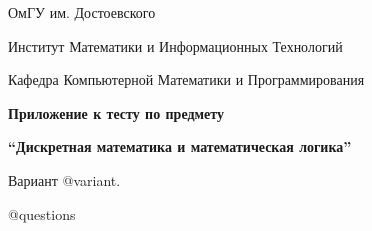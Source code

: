 \documentclass[russian]{article}
\begin{document}
\begin{flushright}
ОмГУ им. Достоевского
\par Институт Математики и Информационных Технологий
\par Кафедра Компьютерной Математики и Программирования
\end{flushright}

\begin{center}
\par\textbf{\large{}Приложение к тесту по предмету}{\large\par}
\par \textbf{\large{}``Дискретная математика и математическая логика''}{\large\par}

\begin{spacing}{3}
\par Вариант @variant.
\end{spacing}

\end{center}

\begin{enumerate}
@questions
\end{enumerate}
\end{document}
